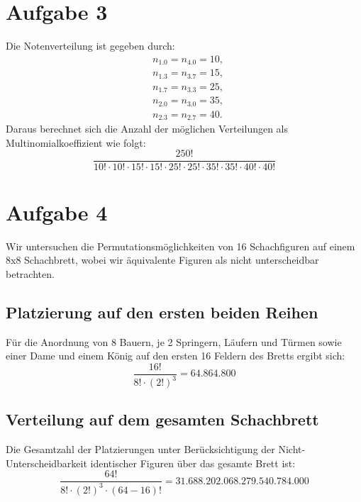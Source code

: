 \documentclass{article}
\begin{document}

\section*{Aufgabe 3}

Die Notenverteilung ist gegeben durch:
\begin{align*}
	 & n_{1.0} = n_{4.0} = 10, \\
	 & n_{1.3} = n_{3.7} = 15, \\
	 & n_{1.7} = n_{3.3} = 25, \\
	 & n_{2.0} = n_{3.0} = 35, \\
	 & n_{2.3} = n_{2.7} = 40.
\end{align*}
Daraus berechnet sich die Anzahl der möglichen Verteilungen als Multinomialkoeffizient wie folgt:
\[
	\frac{250!}{10! \cdot 10! \cdot 15! \cdot 15! \cdot 25! \cdot 25! \cdot 35! \cdot 35! \cdot 40! \cdot 40!}
\]

\section*{Aufgabe 4}

Wir untersuchen die Permutationsmöglichkeiten von 16 Schachfiguren auf einem 8x8 Schachbrett, wobei wir äquivalente Figuren als nicht unterscheidbar betrachten.

\subsection*{Platzierung auf den ersten beiden Reihen}
Für die Anordnung von 8 Bauern, je 2 Springern, Läufern und Türmen sowie einer Dame und einem König auf den ersten 16 Feldern des Bretts ergibt sich:
\[
	\frac{16!}{8! \cdot (2!)^3} = 64.864.800
\]

\subsection*{Verteilung auf dem gesamten Schachbrett}
Die Gesamtzahl der Platzierungen unter Berücksichtigung der Nicht-Unterscheidbarkeit identischer Figuren über das gesamte Brett ist:
\[
	\frac{64!}{8! \cdot (2!)^3 \cdot (64-16)!} = 31.688.202.068.279.540.784.000
\]
\end{document}
